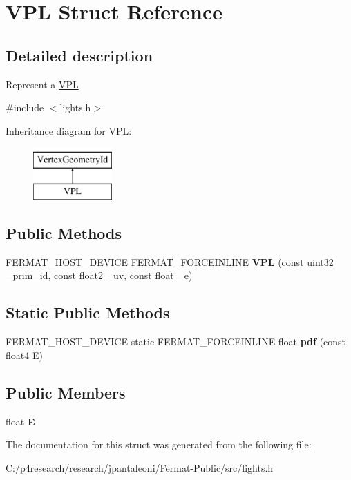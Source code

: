 \hypertarget{struct_v_p_l}{}\section{V\+PL Struct Reference}
\label{struct_v_p_l}


\subsection{Detailed description}
Represent a \hyperlink{struct_v_p_l}{V\+PL} 

{\ttfamily \#include $<$lights.\+h$>$}

Inheritance diagram for V\+PL\+:\begin{figure}[H]
\begin{center}
\leavevmode
\includegraphics[height=2.000000cm]{struct_v_p_l}
\end{center}
\end{figure}
\subsection*{Public Methods}
\begin{DoxyCompactItemize}
\item 
\mbox{\label{struct_v_p_l_a70dc0415ce40e4e2b8d1184764ba0de7}} 
F\+E\+R\+M\+A\+T\+\_\+\+H\+O\+S\+T\+\_\+\+D\+E\+V\+I\+CE F\+E\+R\+M\+A\+T\+\_\+\+F\+O\+R\+C\+E\+I\+N\+L\+I\+NE {\bfseries V\+PL} (const uint32 \+\_\+prim\+\_\+id, const float2 \+\_\+uv, const float \+\_\+e)
\end{DoxyCompactItemize}
\subsection*{Static Public Methods}
\begin{DoxyCompactItemize}
\item 
\mbox{\label{struct_v_p_l_ae9db4ddb4ee695eca55aa3357ad8cbf2}} 
F\+E\+R\+M\+A\+T\+\_\+\+H\+O\+S\+T\+\_\+\+D\+E\+V\+I\+CE static F\+E\+R\+M\+A\+T\+\_\+\+F\+O\+R\+C\+E\+I\+N\+L\+I\+NE float {\bfseries pdf} (const float4 E)
\end{DoxyCompactItemize}
\subsection*{Public Members}
\begin{DoxyCompactItemize}
\item 
\mbox{\label{struct_v_p_l_a2d24749572ebbd60784d19749fbbf6ba}} 
float {\bfseries E}
\end{DoxyCompactItemize}


The documentation for this struct was generated from the following file\+:\begin{DoxyCompactItemize}
\item 
C\+:/p4research/research/jpantaleoni/\+Fermat-\/\+Public/src/lights.\+h\end{DoxyCompactItemize}
